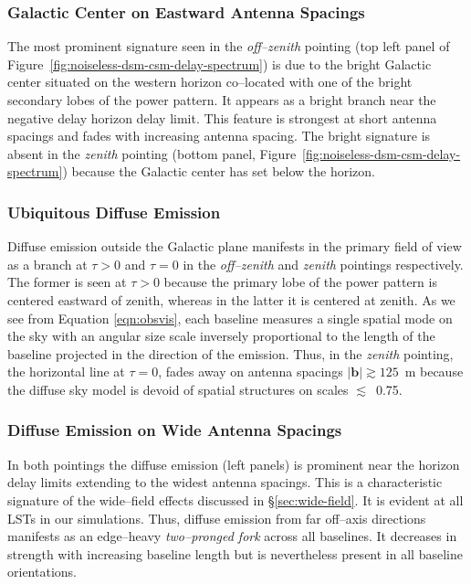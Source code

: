 \documentclass[preprint2,iop,numberedappendix,twocolappendix,appendixfloats]{emulateapj}
\begin{document}
\subsubsection{Galactic Center on Eastward Antenna Spacings}\label{sec:GC-east}

The most prominent signature seen in the {\it off--zenith} pointing (top left panel of Figure~\ref{fig:noiseless-dsm-csm-delay-spectrum}) is due to the bright Galactic center situated on the western horizon co--located with one of the bright secondary lobes of the power pattern. It appears as a bright branch near the negative delay horizon delay limit. This feature is strongest at short antenna spacings and fades with increasing antenna spacing. The bright signature is absent in the {\it zenith} pointing (bottom panel, Figure~\ref{fig:noiseless-dsm-csm-delay-spectrum}) because the Galactic center has set below the horizon. 

\subsubsection{Ubiquitous Diffuse Emission}\label{sec:diffuse-features}

Diffuse emission outside the Galactic plane manifests in the primary field of view as a branch at $\tau>0$ and $\tau=0$ in the {\it off--zenith} and {\it zenith} pointings respectively. The former is seen at $\tau>0$ because the primary lobe of the power pattern is centered eastward of zenith, whereas in the latter it is centered at zenith. As we see from Equation \ref{eqn:obsvis}, each baseline measures a single spatial mode on the sky with an angular size scale inversely proportional to the length of the baseline projected in the direction of the emission. Thus, in the {\it zenith} pointing, the horizontal line at $\tau=0$, fades away on antenna spacings $|\boldsymbol{b}| \gtrsim 125$~m because the diffuse sky model is devoid of spatial structures on scales $\lesssim$~0.75\arcdeg. 

\subsubsection{Diffuse Emission on Wide Antenna Spacings}\label{sec:diffuse-long-baselines}

In both pointings the diffuse emission (left panels) is prominent near the horizon delay limits extending to the widest antenna spacings. This is a characteristic signature of the wide--field effects discussed in \S\ref{sec:wide-field}. It is evident at all LSTs in our simulations. Thus, diffuse emission from far off--axis directions manifests as an edge--heavy {\it two--pronged fork} across all baselines. It decreases in strength with increasing baseline length but is nevertheless present in all baseline orientations.   
\end{document}
